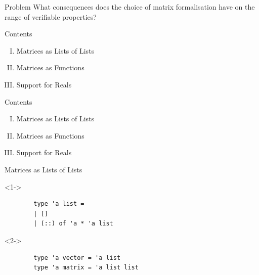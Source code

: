 \documentclass{beamer}
\begin{document}
\begin{frame}
	\begin{block}{Problem}
		What consequences does the choice of matrix formalisation have on the range of verifiable properties?
	\end{block}
\end{frame}

\begin{frame}{Contents}
	\begin{enumerate}[I.]
		\item<1-> Matrices as Lists of Lists
		\item<2-> Matrices as Functions
		\item<3-> Support for Reals
	\end{enumerate}
\end{frame}


\begin{frame}{Contents}
	\begin{enumerate}[I.]
		\item<1> Matrices as Lists of Lists
		\item<0> Matrices as Functions
		\item<0> Support for Reals
	\end{enumerate}
\end{frame}

\begin{frame}[fragile]{Matrices as Lists of Lists}
	\begin{onlyenv}<1->
	\begin{lstlisting}
		type 'a list =
		| []
		| (::) of 'a * 'a list
	\end{lstlisting}
	\end{onlyenv}
	
	\begin{onlyenv}<2->
	\begin{lstlisting}
		type 'a vector = 'a list
		type 'a matrix = 'a list list
	\end{lstlisting}
	\end{onlyenv}
\end{frame}

\end{document}
